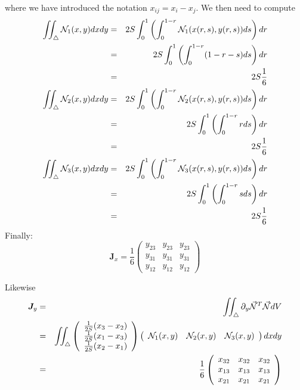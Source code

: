 where we have introduced the notation $x_{ij}=x_i-x_j$.
We then need to compute
\begin{eqnarray}
\iint_\triangle {\mathcal{N}}_1(x,y) dx dy 
&=& 2S \int_0^{1} \left(\int_0^{1-r} {\mathcal{N}}_1(x(r,s),y(r,s))  ds \right) dr \nonumber\\ 
&=& 2S \int_0^{1} \left(\int_0^{1-r} (1-r-s)  ds \right) dr \nonumber\\ 
&=& 2S \frac{1}{6} \label{eq:elmats:1}\\ 
\iint_\triangle {\mathcal{N}}_2(x,y) dx dy 
&=& 2S \int_0^{1} \left(\int_0^{1-r} {\mathcal{N}}_2(x(r,s),y(r,s))  ds \right) dr \nonumber\\ 
&=& 2S \int_0^{1} \left(\int_0^{1-r} r  ds \right) dr \nonumber\\ 
&=& 2S \frac{1}{6} \label{eq:elmats:2}\\ 
\iint_\triangle {\mathcal{N}}_3(x,y) dx dy 
&=& 2S \int_0^{1} \left(\int_0^{1-r} {\mathcal{N}}_3(x(r,s),y(r,s))  ds \right) dr \nonumber\\ 
&=& 2S \int_0^{1} \left(\int_0^{1-r} s  ds \right) dr \nonumber\\ 
&=& 2S \frac{1}{6} \label{eq:elmats:3} 
\end{eqnarray}
Finally:
\[
{\bm J}_x
=
\frac{1}{6}
\left(
\begin{array}{ccc}
y_{23} & y_{23} & y_{23} \\ 
y_{31} & y_{31} & y_{31} \\ 
y_{12} & y_{12} & y_{12}  
\end{array}
\right) 
\]

Likewise
\begin{eqnarray}
{\bm J}_y
&=& \iint_\triangle  \partial_y \vec{{\mathcal{N}}}^T \vec{{\mathcal{N}}} dV \nonumber\\
&=&  \iint_\triangle 
\left(
\begin{array}{c}
\frac{1}{2S}(x_3-x_2) \\
\frac{1}{2S}(x_1-x_3) \\
\frac{1}{2S}(x_2-x_1)
\end{array}
\right)
\left(
\begin{array}{ccc}
{\mathcal{N}}_1(x,y) & {\mathcal{N}}_2(x,y) & {\mathcal{N}}_3(x,y) 
\end{array}
\right) dx dy \nonumber\\
&=&
\frac{1}{6}
\left(
\begin{array}{ccc}
x_{32} & x_{32} & x_{32} \\ 
x_{13} & x_{13} & x_{13} \\ 
x_{21} & x_{21} & x_{21}  
\end{array}
\right) 
\end{eqnarray}

